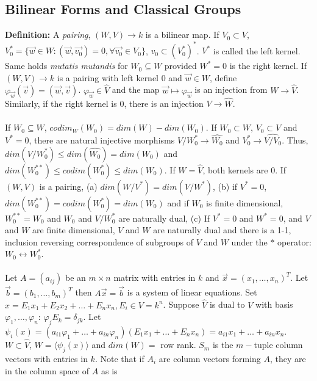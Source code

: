 \subsection {Bilinear Forms and Classical Groups}
{\bf Definition:}
A \emph{pairing}, $(W,V) \rightarrow k$ is a bilinear map.  If $V_0 \subset V$, 
$V_0^* = \{{\vec w} \in W: ({\vec w}, {\vec {v_0}})= 0, \forall {\vec {v_0}} \in V_0 \}$,
$v_0 \subset (V_0^*)^*$.  $V^*$ is called the left kernel. 
Same holds {\it mutatis mutandis}
for $W_0 \subseteq W$ provided $W^* = 0$ is the right kernel.
If $(W,V) \rightarrow k$ is a pairing with left kernel $0$ and
${\vec {w}} \in W$, define $\varphi_{\vec w} ({\vec v}) = ({\vec w}, {\vec v})$.  
$\varphi_{\vec w} \in {\hat V}$ and the map
${\vec w} \mapsto \varphi_{\vec w}$ 
is an injection from $W \rightarrow {\hat {V}}$.
Similarly,
if the right kernel is $0$, there is an injection $V \rightarrow {\hat W}$.
\\
\\
If $W_0 \subseteq W$, $codim_W(W_0)= dim(W)-dim(W_0)$.
If $W_0 \subset W$, $V_0 \subset V$ and $V^*=0$,
there are natural injective morphisms
$V/W_0^* \rightarrow {\hat {W_0}}$ and $V_0^* \rightarrow {\hat {V/V_0}}$. 
Thus, $dim(V/W_0^*) \le dim({\hat {W_0}})=dim(W_0)$ and 
$dim(W_0^{**}) \le codim(W_0^*) \le dim(W_0)$.
If $W= {\hat V}$, both kernels are $0$.
If $(W,V)$ is a pairing, (a) $dim(W/V^*) = dim(V/W^*)$, (b) if $V^* = 0$,
$dim(W_0^{**}) = codim(W_0^*) = dim(W_0)$ and if $W_0$ is
finite dimensional, $W_0^{**}= W_0$ and $W_0$ and $V/W_0^*$ are
naturally dual, (c) If $V^*=0$ and $W^*=0$, and $V$ and $W$ are
finite dimensional, $V$ and $W$ are naturally dual and there is a 1-1,
inclusion reversing correspondence of subgroups of
$V$ and $W$ under the $*$ operator: $W_0 \leftrightarrow W_0^*$.
\\
\\
Let $A=(a_{ij})$ be an $m \times n$ matrix with entries in $k$ and
${\vec x}= (x_1, \ldots , x_n)^T$.  Let
${\vec b}=(b_1 , \ldots , b_m)^T$ then $A {\vec x}= {\vec b}$ is a system
of linear equations.  Set
$x=E_1 x_1 + E_2 x_2 + \ldots + E_n x_n, E_i \in V= k^n$.  
Suppose ${\hat V}$ is dual to $V$ with basis
$\varphi_1 , \ldots , \varphi_n$: $\varphi_j E_k= \delta_{jk}$.  Let
$\psi_i (x) = (a_{i1} \varphi_1 + \ldots + a_{in} \varphi_n) (E_1 x_1 + \ldots + E_n x_n)=
a_{i1}x_1 + \ldots + a_{in}x_n$.  $W \subset {\hat V}$, $W = \langle \psi_j(x) \rangle$
and $dim(W)=$ row rank. $S_m$ is the $m-$tuple column vectors
with entries in $k$.
Note that if $A_i$ are column vectors 
forming $A$, they are in the column space of $A$ as is
